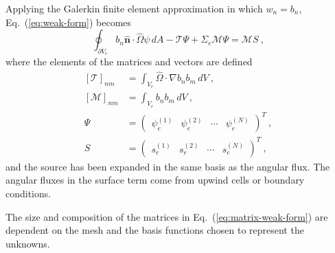 \documentclass[12pt]{article}
\newcommand{\ve}[1]{\ensuremath{\mathbf{#1}}}
\newcommand{\vOmega}{\ensuremath{\hat{\Omega}}}
\begin{document}
Applying the Galerkin finite element approximation in which $w_n=b_n$, 
Eq.~(\ref{eq:weak-form}) becomes
\begin{equation}
  \oint_{\partial V_e}b_n\hat{\ve{n}}\cdot\vOmega\psi\,dA -
  \mathcal{T}\Psi + \Sigma_e\mathcal{M}\Psi = \mathcal{M}S\:,
  \label{eq:matrix-weak-form}
\end{equation}
where the elements of the matrices and vectors are defined
\begin{equation}
  \begin{aligned}
    \left[\mathcal{T}\right]_{nm} &= \int_{V_e}\vOmega\cdot\nabla
    b_n b_m\,dV\:,\\
    \left[\mathcal{M}\right]_{nm} &= \int_{V_e}b_nb_m\,dV\:, \\
    \Psi &= \begin{pmatrix} \psi_e^{(1)} & \psi_e^{(2)} & \cdots &
      \psi_e^{(N)}
    \end{pmatrix}^T\:,\\
    S &= \begin{pmatrix} s_e^{(1)} & s_e^{(2)} & \cdots & s_e^{(N)}
    \end{pmatrix}^T\:,
  \end{aligned}
  \label{eq:weak_form_matrices}
\end{equation}
and the source has been expanded in the same basis as the angular flux.  The
angular fluxes in the surface term come from upwind cells or boundary
conditions.

The size and composition of the matrices in Eq.~(\ref{eq:matrix-weak-form})
are dependent on the mesh and the basis functions chosen to represent the
unknowns.  
\end{document}

